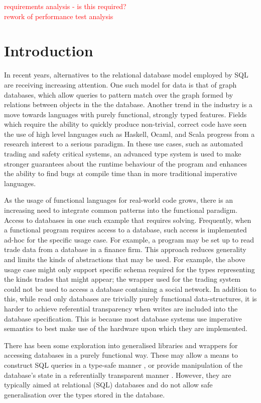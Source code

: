 \documentclass[12pt,a4paper,twoside,openright]{report}
\newcommand\todo[1]{\textcolor{red}{#1}}
\begin{document}
\pagestyle{headings}

\todo{requirements analysis - is this required?}\\
\todo{rework of performance test analysis}\\

\chapter{Introduction}
In recent years, alternatives to the relational database model employed by SQL are receiving increasing attention. One such model for data is that of graph databases, which allow queries to pattern match over the graph formed by relations between objects in the the database. Another trend in the industry is a move towards languages with purely functional, strongly typed features. Fields which require the ability to quickly produce non-trivial, correct code have seen the use of high level languages such as Haskell, Ocaml, and Scala progress from a research interest to a serious paradigm. In these use cases, such as automated trading and safety critical systems, an advanced type system is used to  make stronger guarantees about the runtime behaviour of the program and enhances the ability to find bugs at compile time than in more traditional imperative languages.
	
	As the usage of functional languages for real-world code grows, there is an increasing need to integrate common patterns into the functional paradigm. Access to databases in one such example that requires solving. Frequently, when a functional program requires access to a database, such access is implemented ad-hoc for the specific usage case. For example, a program may be set up to read trade data from a database in a finance firm. This approach reduces generality and limits the kinds of abstractions that may be used. For example, the above usage case might only support specific schema required for the types representing the kinds trades that might appear; the wrapper used for the trading system could not be used to access a database containing a social network. In addition to this, while read only databases are trivially purely functional data-structures, it is harder to achieve referential transparency when writes are included into the database specification. This is because most database systems use imperative semantics to best make use of the hardware upon which they are implemented.

	There has been some exploration into generalised libraries and wrappers for accessing databases in a purely functional way. These may allow a means to construct SQL queries in a type-safe manner \cite{HaskellDB}, or provide manipulation of the database’s state in a referentially transparent manner \cite{DBStates}. However, they are typically aimed at relational (SQL) databases and do not allow safe generalisation over the types stored in the database.
\end{document}

